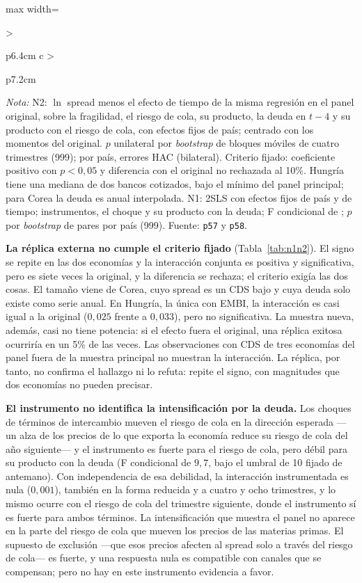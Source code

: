 \begin{table}[htbp]
\begin{adjustbox}{max width=\linewidth}
\begin{tabular}{>{\raggedright\arraybackslash}p{6.4cm} c >{\raggedright\arraybackslash}p{7.2cm}}
\bottomrule
\end{tabular}
\end{adjustbox}
\par\smallskip\parbox{0.95\linewidth}{\footnotesize \textit{Nota:} N2: $\ln$ spread menos el efecto de tiempo de la misma regresión en el panel original, sobre la fragilidad, el riesgo de cola, su producto, la deuda en $t-4$ y su producto con el riesgo de cola, con efectos fijos de país; centrado con los momentos del original. $p$ unilateral por \textit{bootstrap} de bloques móviles de cuatro trimestres (999); por país, errores HAC (bilateral). Criterio fijado: coeficiente positivo con $p<0{,}05$ y diferencia con el original no rechazada al 10\%. Hungría tiene una mediana de dos bancos cotizados, bajo el mínimo del panel principal; para Corea la deuda es anual interpolada. N1: 2SLS con efectos fijos de país y de tiempo; instrumentos, el choque y su producto con la deuda; F condicional de \citet{SandersonWindmeijer2016}; $p$ por \textit{bootstrap} de pares por país (999). Fuente: \texttt{p57} y \texttt{p58}.}
\end{table}

\textbf{La réplica externa no cumple el criterio fijado} (Tabla~\ref{tab:n1n2}). El signo se repite en las dos economías y la interacción conjunta es positiva y significativa, pero es siete veces la original, y la diferencia se rechaza; el criterio exigía las dos cosas. El tamaño viene de Corea, cuyo spread es un CDS bajo y cuya deuda solo existe como serie anual. En Hungría, la única con EMBI, la interacción es casi igual a la original ($0{,}025$ frente a $0{,}033$), pero no significativa. La muestra nueva, además, casi no tiene potencia: si el efecto fuera el original, una réplica exitosa ocurriría en un 5\% de las veces. Las observaciones con CDS de tres economías del panel fuera de la muestra principal no muestran la interacción. La réplica, por tanto, no confirma el hallazgo ni lo refuta: repite el signo, con magnitudes que dos economías no pueden precisar.

\textbf{El instrumento no identifica la intensificación por la deuda.} Los choques de términos de intercambio mueven el riesgo de cola en la dirección esperada ---un alza de los precios de lo que exporta la economía reduce su riesgo de cola del año siguiente--- y el instrumento es fuerte para el riesgo de cola, pero débil para su producto con la deuda (F condicional de $9{,}7$, bajo el umbral de 10 fijado de antemano). Con independencia de esa debilidad, la interacción instrumentada es nula ($0{,}001$), también en la forma reducida y a cuatro y ocho trimestres, y lo mismo ocurre con el riesgo de cola del trimestre siguiente, donde el instrumento sí es fuerte para ambos términos. La intensificación que muestra el panel no aparece en la parte del riesgo de cola que mueven los precios de las materias primas. El supuesto de exclusión ---que esos precios afecten al spread solo a través del riesgo de cola--- es fuerte, y una respuesta nula es compatible con canales que se compensan; pero no hay en este instrumento evidencia a favor.


